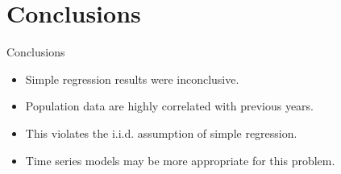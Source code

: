 \documentclass[11pt]{beamer}
\begin{document}
\section{Conclusions}

\begin{frame}{Conclusions}

	\begin{itemize}
		\item Simple regression results were inconclusive.
		\item Population data are highly correlated with previous years.
		\item This violates the i.i.d. assumption of simple regression.
		\item Time series models may be more appropriate for this problem.
	\end{itemize}

\end{frame}
\end{document}
